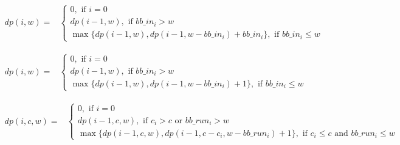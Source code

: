 \begin{strip}
        \begin{align}
                dp(i, w) = & 
                \left\{
                        \begin{array}{l}
                                0, \text{ if $i=0$ } \\ [1em]
                                dp(i-1, w), \text{ if $bb\_in_i > w$} \\ [1em]
                                \max \{ dp(i-1, w), dp(i-1, w-bb\_in_i) + bb\_in_i \}, \text{ if $bb\_in_i \leq w$}
                        \end{array} 
                \right.
                \label{Equ:MaxTransferDataRecursion} 
        \end{align}
\end{strip}

\begin{strip}
        \begin{align}
                dp(i, w) = &
                \left\{
                        \begin{array}{l}
                                0, \text{ if $i=0$ } \\ [1em]
                                dp(i-1, w), \text{ if $bb\_in_i > w$} \\ [1em]
                                \max \{ dp(i-1, w), dp(i-1, w-bb\_in_i) + 1 \}, \text{ if $bb\_in_i \leq w$}
                        \end{array} 
                \right.
                \label{Equ:MaxTaskNumberRecursion}
        \end{align}
\end{strip}


\begin{strip}
        \begin{align}
                dp(i, c, w) = &
                \left\{
                        \begin{array}{l}
                                0, \text{ if $i=0$ } \\ [1em]
                                dp(i-1, c, w), \text{ if $c_i > c$ or $bb\_run_i > w$} \\ [1em]
                                \max \{ dp(i-1, c, w), dp(i-1, c - c_i, w - bb\_run_i) + 1 \}, \text{ if $c_i \leq c$ and $bb\_run_i \leq w$}
                        \end{array} 
                \right.
                \label{Equ:MaxProductRecursion}
        \end{align}
\end{strip}

